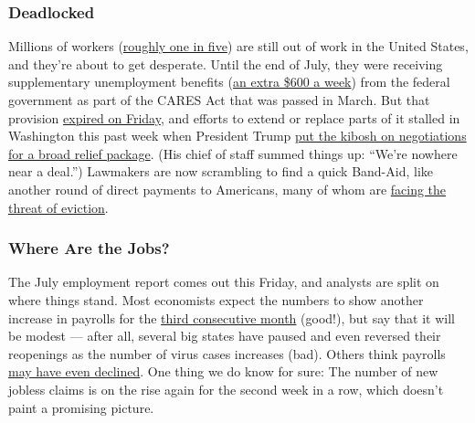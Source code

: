 \hypertarget{deadlocked}{%
\subsubsection{Deadlocked}\label{deadlocked}}

Millions of workers
(\href{https://www.nytimes3xbfgragh.onion/2020/07/17/business/how-many-are-collecting-unemployment-benefits-its-hard-to-say.html}{roughly
one in five}) are still out of work in the United States, and they're
about to get desperate. Until the end of July, they were receiving
supplementary unemployment benefits
(\href{https://www.nytimes3xbfgragh.onion/article/coronavirus-stimulus-package-questions-answers.html}{an
extra \$600 a week}) from the federal government as part of the CARES
Act that was passed in March. But that provision
\href{https://www.nytimes3xbfgragh.onion/2020/07/21/business/economy/coronavirus-unemployment-benefits.html}{expired
on Friday}, and efforts to extend or replace parts of it stalled in
Washington this past week when President Trump
\href{https://www.nytimes3xbfgragh.onion/2020/07/29/business/economy/virus-aid-trump.html}{put
the kibosh on negotiations for a broad relief package}. (His chief of
staff summed things up: ``We're nowhere near a deal.'') Lawmakers are
now scrambling to find a quick Band-Aid, like another round of direct
payments to Americans, many of whom are
\href{https://www.nytimes3xbfgragh.onion/2020/07/29/business/economy/unemployment-benefits-coronavirus.html}{facing
the threat of eviction}.

\hypertarget{where-are-the-jobs}{%
\subsubsection{Where Are the Jobs?}\label{where-are-the-jobs}}

The July employment report comes out this Friday, and analysts are split
on where things stand. Most economists expect the numbers to show
another increase in payrolls for the
\href{https://www.nytimes3xbfgragh.onion/2020/07/02/business/economy/jobs-unemployment-coronavirus.html}{third
consecutive month} (good!), but say that it will be modest --- after
all, several big states have paused and even reversed their reopenings
as the number of virus cases increases (bad). Others think payrolls
\href{https://www.nytimes3xbfgragh.onion/live/2020/07/24/business/stock-market-updates-coronavirus/state-jobless-filings-started-to-head-back-up-last-week}{may
have even declined}. One thing we do know for sure: The number of new
jobless claims is on the rise again for the second week in a row, which
doesn't paint a promising picture.

